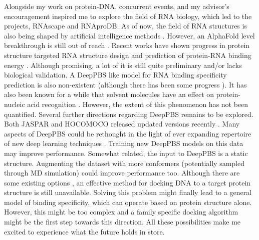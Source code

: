 Alongside my work on protein-DNA, concurrent events, and my advisor's encouragement inspired me to explore the field of RNA biology, which led to the projects, RNAscape and RNAproDB. As of now, the field of RNA structures is also being shaped by artificial intelligence methods \citep{he2024ribonanza}. However, an AlphaFold level breakthrough is still out of reach \citep{schneider2023will}. Recent works have shown progress in protein structure targeted RNA structure design \citep{nori2024rnaflow} and prediction of protein-RNA binding energy \citep{han2024copra}. Although promising, a lot of it is still quite preliminary and/or lacks biological validation. A DeepPBS like model for RNA binding specificity prediction is also non-existent (although there has been some progress \citep{Lam2019}). It has also been known for a while that solvent molecules have an effect on protein-nucleic acid recognition \citep{Otwinowski1988}. However, the extent of this phenomenon has not been quantified. Several further directions regarding DeepPBS remains to be explored. Both JASPAR and HOCOMOCO released updated versions recently \citep{Rauluseviciute2024,vorontsov2024hocomoco}. Many aspects of DeepPBS could be rethought in the light of ever expanding repertoire of new deep learning techniques \citep{ho2020denoising, anand2022protein}. Training new DeepPBS models on this data may improve performance. Somewhat related, the input to DeepPBS is a static structure. Augmenting the dataset with more conformers (potentially sampled through MD simulation) could improve performance too. Although there are some existing options \citep{van2006information}, an effective method for docking DNA to a target protein structure is still unavailable. Solving this problem might finally lead to a general model of binding specificity, which can operate based on protein structure alone. However, this might be too complex and a family specific docking algorithm might be the first step towards this direction. All these possibilities make me excited to experience what the future holds in store.

